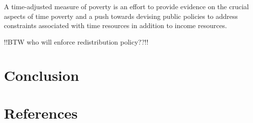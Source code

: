 \documentclass[
  11pt,
]{article}
\begin{document}
A time-adjusted measure of poverty is an effort to provide evidence on
the crucial aspects of time poverty and a push towards devising public
policies to address constraints associated with time resources in
addition to income resources.

!!BTW who will enforce redistribution policy??!!

\section{Conclusion}\label{conclusion}

\section*{References}\label{sec-ref}
\end{document}
